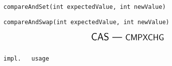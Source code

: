 \begin{frame}[fragile]{}
  \centerline{\texttt{compareAndSet(int expectedValue, int newValue)}}

  \centerline{\texttt{compareAndSwap(int expectedValue, int newValue)}}

  \[
    \text{\Large \textsf{CAS --- {\large CMPXCHG}}}
  \]

  \begin{columns}
      \begin{lstlisting}[style = Cstyle]
        impl.
      \end{lstlisting}
      \begin{lstlisting}[style = Cstyle]
        usage
      \end{lstlisting}
  \end{columns}
\end{frame}

\begin{frame}{}
  \centerline{}

  \begin{columns}


  \end{columns}
\end{frame}
